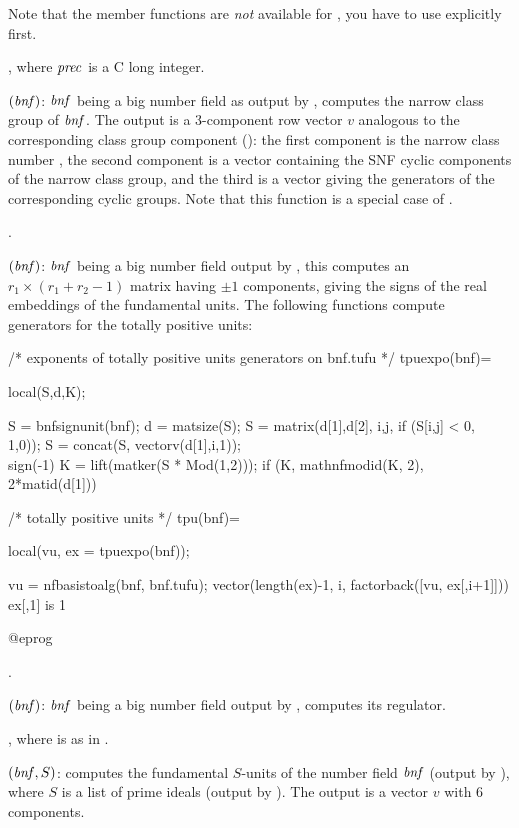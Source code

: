 Note that the member functions are \emph{not} available for , you
have to use  explicitly first.

, where $\hbox{\it prec\/}$ is a
C long integer.

$(\hbox{\it bnf\/})$: $\hbox{\it bnf\/}$ being a big number field as
output by , computes the narrow class group of $\hbox{\it bnf\/}$. The
output is a 3-component row vector $v$ analogous to the corresponding
class group component  (): the
first component is the narrow class number , the second component
is a vector containing the SNF cyclic components
 of the narrow
class group, and the third is a vector giving the generators of the
corresponding  cyclic groups. Note that this function is a
special case of .

.

$(\hbox{\it bnf\/})$: $\hbox{\it bnf\/}$ being a big number field
output by , this computes an $r_1\times(r_1+r_2-1)$ matrix
having $\pm1$ components, giving the signs of the real embeddings of the
fundamental units. The following functions compute generators for the totally
positive units:

\bprog
/* exponents of totally positive units generators on bnf.tufu */
tpuexpo(bnf)=
{ local(S,d,K);

  S = bnfsignunit(bnf); d = matsize(S);
  S = matrix(d[1],d[2], i,j, if (S[i,j] < 0, 1,0));
  S = concat(S, vectorv(d[1],i,1));   \\ sign(-1)
  K = lift(matker(S * Mod(1,2)));
  if (K, mathnfmodid(K, 2), 2*matid(d[1]))
}

/* totally positive units */
tpu(bnf)=
{ local(vu, ex = tpuexpo(bnf));

  vu = nfbasistoalg(bnf, bnf.tufu);
  vector(length(ex)-1, i, factorback([vu, ex[,i+1]]))  \\ ex[,1] is 1
}
@eprog

.

$(\hbox{\it bnf\/})$: $\hbox{\it bnf\/}$ being a big number field
output by , computes its regulator.

, where  is as in
.

$(\hbox{\it bnf\/},S)$: computes the fundamental $S$-units of the
number field $\hbox{\it bnf\/}$ (output by ), where $S$ is a list of
prime ideals (output by ). The output is a vector $v$ with
6 components.

